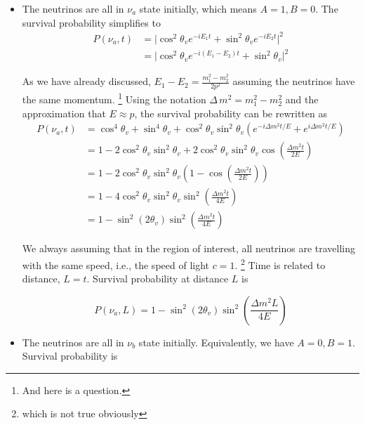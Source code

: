 \documentclass{tufte-handout}
\begin{document}
\begin{itemize}
    \item
    The neutrinos are all in $\nu_a$ state initially, which means $A=1, B=0$. The survival probability simplifies to
    \begin{align*}
    P(\nu_a,t) & = \lvert \cos^2\theta_v e^{-iE_1t} + \sin^2\theta_v e^{-iE_2t} \rvert^2  \\
    & = \lvert \cos^2\theta_v e^{-i(E_1 - E_2) t} + \sin^2\theta_v \rvert^2
    \end{align*}
    
    As we have already discussed, $E_1-E_2 = \frac{m_1^2 - m_2^2}{2p^2}$ assuming the neutrinos have the same momentum. \footnote{And here is a question.} Using the notation $\Delta \, m^2 = m_1^2 - m_2^2$ and the approximation that $E\approx p$, the survival probability can be rewritten as
    \begin{align*}
    P(\nu_a,t) & = \cos^4\theta_v + \sin^4\theta_v + \cos^2\theta_v \sin^2\theta_v \left( e^{-i \Delta m^2 t/E} + e^{i \Delta m^2 t/E} \right) \\
    & = 1 - 2\cos^2\theta_v \sin^2\theta_v + 2\cos^2\theta_v \sin^2\theta_v \cos\left( \frac{\Delta m^2 t}{2E}\right) \\
    & = 1 - 2\cos^2\theta_v \sin^2\theta_v \left( 1 - \cos\left( \frac{\Delta m^2 t}{2E} \right)  \right) \\
    & = 1 - 4 \cos^2\theta_v \sin^2\theta_v \sin^2 \left( \frac{\Delta m^2 t}{4E} \right) \\
    & = 1 - \sin^2(2\theta_v) \sin^2 \left( \frac{\Delta m^2 t}{4E} \right)
    \end{align*}
    
    
We always assuming that in the region of interest, all neutrinos are travelling with the same speed, i.e., the speed of light $c=1$. \footnote{which is not true obviously} Time is related to distance, $L = t$. Survival probability at distance $L$ is

\begin{equation}
P(\nu_a, L) = 1 -  \sin^2 (2\theta_v) \sin^2 \left( \frac{\Delta m^2 L}{4E} \right)
\end{equation}
    
    \item
    The neutrinos are all in $\nu_b$ state initially. Equivalently, we have $A=0, B = 1$. Survival probability is
    

\end{itemize}
\end{document}
